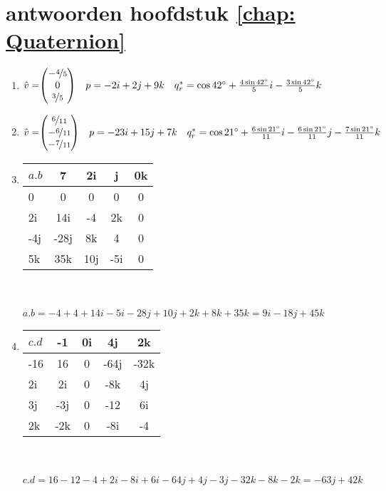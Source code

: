 \section{antwoorden  hoofdstuk \ref{chap: Quaternion}}
\begin{enumerate}
	\item 
	$\hat{v} = \vecdrie{-\nicefrac{4}{5}}{0}{\nicefrac{3}{5}}
	\quad p  = -2i +2j + 9k 
	\quad q^*_r  =  \cos 42 \degree  + \frac{4 \sin 42 \degree}{5}i -
	\frac{3 \sin 42 \degree}{5}k$
	
	\item 
	$\hat{v} = \vecdrie{\nicefrac{6}{11}}{-\nicefrac{6}{11}}{-\nicefrac{7}{11}}
	\quad p  = -23i +15j + 7k 
	\quad q^*_r  =  \cos 21 \degree  + \frac{6 \sin 21 \degree}{11}i 
	-\frac{6 \sin 21 \degree}{11}j
	-\frac{7 \sin 21 \degree}{11}k$
	
	\item
	\begin{tabular}{ | l || c | c |c |c |}
		\hline
		$ a.b $ & 7 & 2i   & j & 0k \\ \hline \hline
		0    & 0 & 0   &   0        & 0  \\ \hline
		2i    & 14i & -4   &   2k        & 0  \\ \hline
		-4j   & -28j &  8k &   4     & 0\\ \hline
		5k    & 35k  & 10j   & -5i   & 0\\ 
		\hline 
	\end{tabular} \\ \\
	$ a.b = -4 + 4 +14i -5i -28j +10j +2k + 8k + 35k =  9i -18j +45k $
	
	\item
	\begin{tabular}{ | l || c | c |c |c |}
		\hline
		$ c.d $ & -1 & 0i   & 4j & 2k \\ \hline \hline
		-16    & 16 & 0   &   -64j        & -32k  \\ \hline
		2i    & 2i & 0   &   -8k        & 4j  \\ \hline
		3j   & -3j &  0 &   -12     & 6i\\ \hline
		2k    & -2k  & 0   & -8i   & -4\\ 
		\hline 
	\end{tabular} \\ \\
	$ c.d = 16 -12  -4  + 2i -8i +6i  -64j +4j -3j  -32k - 8k -2k =  -63j + 42k $
	

\end{enumerate}
